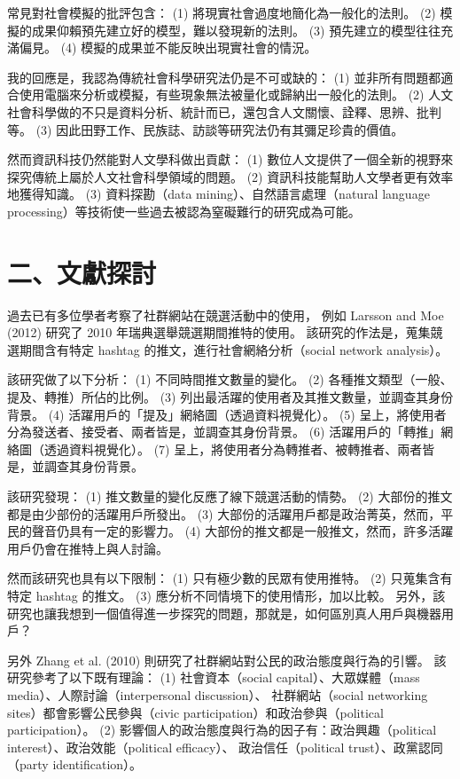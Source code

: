 \documentclass[letterpaper, 10pt, conference]{ieeeconf}   %
\begin{document}
\begin{CJK}{UTF8}{bsmi}
常見對社會模擬的批評包含：
 (1) 將現實社會過度地簡化為一般化的法則。
 (2) 模擬的成果仰賴預先建立好的模型，難以發現新的法則。
 (3) 預先建立的模型往往充滿偏見。
 (4) 模擬的成果並不能反映出現實社會的情況。

我的回應是，我認為傳統社會科學研究法仍是不可或缺的：
 (1) 並非所有問題都適合使用電腦來分析或模擬，有些現象無法被量化或歸納出一般化的法則。
 (2) 人文社會科學做的不只是資料分析、統計而已，還包含人文關懷、詮釋、思辨、批判等。
 (3) 因此田野工作、民族誌、訪談等研究法仍有其彌足珍貴的價值。

然而資訊科技仍然能對人文學科做出貢獻：
 (1) 數位人文提供了一個全新的視野來探究傳統上屬於人文社會科學領域的問題。
 (2) 資訊科技能幫助人文學者更有效率地獲得知識。
 (3) 資料探勘（data mining）、自然語言處理（natural language processing）等技術使一些過去被認為窒礙難行的研究成為可能。

\section*{二、文獻探討}

過去已有多位學者考察了社群網站在競選活動中的使用，
例如 Larsson and Moe (2012) 研究了 2010 年瑞典選舉競選期間推特的使用。\cite{c1}
該研究的作法是，蒐集競選期間含有特定 hashtag 的推文，進行社會網絡分析（social network analysis）。

該研究做了以下分析：
 (1) 不同時間推文數量的變化。
 (2) 各種推文類型（一般、提及、轉推）所佔的比例。
 (3) 列出最活躍的使用者及其推文數量，並調查其身份背景。
 (4) 活躍用戶的「提及」網絡圖（透過資料視覺化）。
 (5) 呈上，將使用者分為發送者、接受者、兩者皆是，並調查其身份背景。
 (6) 活躍用戶的「轉推」網絡圖（透過資料視覺化）。
 (7) 呈上，將使用者分為轉推者、被轉推者、兩者皆是，並調查其身份背景。

該研究發現：
 (1) 推文數量的變化反應了線下競選活動的情勢。
 (2) 大部份的推文都是由少部份的活躍用戶所發出。
 (3) 大部份的活躍用戶都是政治菁英，然而，平民的聲音仍具有一定的影響力。
 (4) 大部份的推文都是一般推文，然而，許多活躍用戶仍會在推特上與人討論。

然而該研究也具有以下限制：
 (1) 只有極少數的民眾有使用推特。
 (2) 只蒐集含有特定 hashtag 的推文。
 (3) 應分析不同情境下的使用情形，加以比較。
另外，該研究也讓我想到一個值得進一步探究的問題，那就是，如何區別真人用戶與機器用戶？

另外 Zhang et al. (2010) 則研究了社群網站對公民的政治態度與行為的引響。\cite{c2}
該研究參考了以下既有理論：
 (1) 社會資本（social capital）、大眾媒體（mass media）、人際討論（interpersonal discussion）、
社群網站（social networking sites）都會影響公民參與（civic participation）和政治參與（political participation）。
 (2) 影響個人的政治態度與行為的因子有：政治興趣（political interest）、政治效能（political efficacy）、
政治信任（political trust）、政黨認同（party identification）。


\end{CJK}
\end{document}
